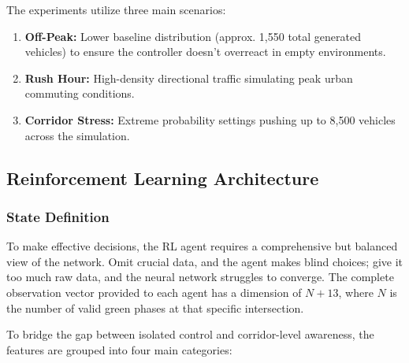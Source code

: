 \documentclass[conference]{IEEEtran}
\begin{document}
The experiments utilize three main scenarios:
\begin{enumerate}
    \item \textbf{Off-Peak:} Lower baseline distribution (approx. 1,550 total generated vehicles) to ensure the controller doesn't overreact in empty environments.
    \item \textbf{Rush Hour:} High-density directional traffic simulating peak urban commuting conditions.
    \item \textbf{Corridor Stress:} Extreme probability settings pushing up to 8,500 vehicles across the simulation.
\end{enumerate}

\subsection{Reinforcement Learning Architecture}

\subsubsection{State Definition}
To make effective decisions, the RL agent requires a comprehensive but balanced view of the network. Omit crucial data, and the agent makes blind choices; give it too much raw data, and the neural network struggles to converge. The complete observation vector provided to each agent has a dimension of $N + 13$, where $N$ is the number of valid green phases at that specific intersection.

To bridge the gap between isolated control and corridor-level awareness, the features are grouped into four main categories:
\end{document}

